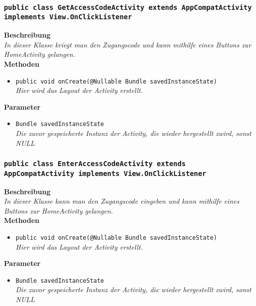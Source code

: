 \subsubsection{\texttt{public class GetAccessCodeActivity extends AppCompatActivity implements View.OnClickListener}}

	\textbf{Beschreibung} \\
	\textit{In dieser Klasse kriegt man den Zugangscode und kann mithilfe eines Buttons zur HomeActivity gelangen.} \\

	\textbf{Methoden}
	\begin{itemize}
		\item\texttt{{public void onCreate(@Nullable Bundle savedInstanceState)}}\\
	\textit{Hier wird das Layout der Activity erstellt.}\\
	\end{itemize}

	\textbf{Parameter}
	\begin{itemize}
		\item\texttt{Bundle savedInstanceState}\\  
	\textit{Die zuvor gespeicherte Instanz der Activity, die wieder hergestellt zwird, sonst NULL}\\
	\end{itemize}  

\subsubsection{\texttt{public class EnterAccessCodeActivity extends AppCompatActivity implements View.OnClickListener}}

	\textbf{Beschreibung} \\
	\textit{In dieser Klasse kann man den Zugangscode eingeben und kann mithilfe eines Buttons zur HomeActivity gelangen.} \\

	\textbf{Methoden}
	\begin{itemize}
		\item\texttt{{public void onCreate(@Nullable Bundle savedInstanceState)}}\\
	\textit{Hier wird das Layout der Activity erstellt.}\\
	\end{itemize}

	\textbf{Parameter}
	\begin{itemize}
		\item\texttt{Bundle savedInstanceState}\\ 
	\textit{Die zuvor gespeicherte Instanz der Activity, die wieder hergestellt zwird, sonst NULL}\\
	\end{itemize} 

